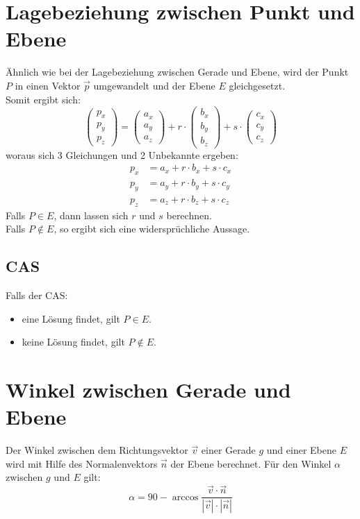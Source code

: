 \documentclass[a4paper,12pt]{article}
\begin{document}
\section{Lagebeziehung zwischen Punkt und Ebene}
Ähnlich wie bei der Lagebeziehung zwischen Gerade und Ebene, wird der Punkt $P$ in einen Vektor $\vec{p}$ umgewandelt und der Ebene $E$ gleichgesetzt.\\
Somit ergibt sich:
$$\begin{pmatrix}p_x\\p_y\\p_z\end{pmatrix} = \begin{pmatrix}a_x\\a_y\\a_z\end{pmatrix} + r \cdot \begin{pmatrix}b_x\\b_y\\b_z\end{pmatrix} + s \cdot \begin{pmatrix}c_x\\c_y\\c_z\end{pmatrix}$$
woraus sich 3 Gleichungen und 2 Unbekannte ergeben:
\begin{equation*}
\begin{split}
p_x & = a_x + r \cdot b_x + s \cdot c_x\\ 
p_y & = a_y + r \cdot b_y + s \cdot c_y\\ 
p_z & = a_z + r \cdot b_z + s \cdot c_z
\end{split}
\end{equation*}
Falls $P \in E$, dann lassen sich $r$ und $s$ berechnen.\\
Falls $P \notin E$, so ergibt sich eine widersprüchliche Aussage.
\subsection{CAS}
Falls der CAS:
\begin{itemize}
\item eine Lösung findet, gilt $P \in E$.
\item keine Lösung findet, gilt $P \notin E$.
\end{itemize}
\section{Winkel zwischen Gerade und Ebene}
Der Winkel zwischen dem Richtungsvektor $\vec{v}$ einer Gerade $g$ und einer Ebene $E$ wird mit Hilfe des Normalenvektors $\vec{n}$ der Ebene berechnet.
Für den Winkel $\alpha$ zwischen $g$ und $E$ gilt:
$$\alpha = 90 - \arccos{\frac{\vec{v} \cdot \vec{n}}{|\vec{v}| \cdot |\vec{n}|}}$$
\pagebreak
\end{document}
